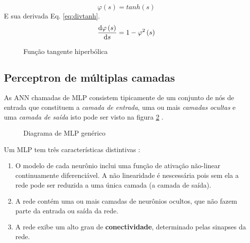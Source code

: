 \begin{itemize}
	\begin{equation} \label{eq:tanh}
	\varphi \left( s \right)  = tanh(s)
	\end{equation}	
	E sua derivada Eq. \ref{eq:divtanh}.
	\begin{equation}\label{eq:divtanh}
	\dv{\varphi \left( s \right)}{s}  = 1 -  \varphi^2 \left( s \right) 
	\end{equation}	
	\begin{figure}[!h]
		\begin{center}
			\caption{Fun\c{c}\~ao tangente hiperb\'olica}			
			
			\label{fig:funcaotanh}
		\end{center}	
	\end{figure}	
\end{itemize}
\subsection{Perceptron de m\'ultiplas camadas}
\par
As \ac{ANN} chamadas de \ac{MLP} consistem tipicamente de um conjunto de n\'os de entrada que constituem a \textit{camada de entrada}, uma ou mais \textit{camadas ocultas} e uma \textit{camada de sa\'ida} isto pode ser visto na figura \ref{fig:MLP} \cite{Haykin2008}.

\begin{figure}[!h]
	\begin{center}
		\caption{Diagrama de MLP gen\'erico}		
		
		\label{fig:MLP}
	\end{center}	
\end{figure}
\par
Um \ac{MLP} tem tr\^es caracter\'isticas distintivas \cite{Haykin2008}:
\begin{enumerate}
	\item 	O modelo de cada neur\^onio inclui uma fun\c{c}\~ao de ativa\c{c}\~ao n\~ao-linear continuamente diferenci\'avel.
	A n\~ao linearidade \'e nescess\'aria pois sem ela a rede pode ser reduzida a uma \'unica camada (a camada de sa\'ida).
	\item  A rede cont\'em uma ou mais camadas de neur\^onios ocultos, que n\~ao fazem parte da entrada ou sa\'ida da rede. 
	\item A rede exibe um alto grau de \textbf{conectividade}, determinado pelas sinapses da rede.
\end{enumerate}
